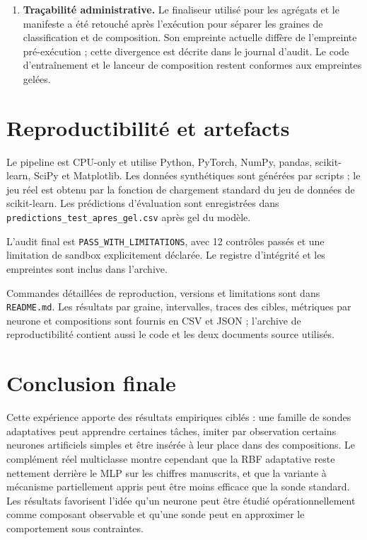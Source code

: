 \documentclass[11pt,a4paper]{article}
\begin{document}
\begin{enumerate}[leftmargin=1.15cm]
\item \textbf{Traçabilité administrative.} Le finaliseur utilisé pour les agrégats et le manifeste a été retouché après l'exécution pour séparer les graines de classification et de composition. Son empreinte actuelle diffère de l'empreinte pré-exécution ; cette divergence est décrite dans le journal d'audit. Le code d'entraînement et le lanceur de composition restent conformes aux empreintes gelées.
\end{enumerate}

\section{Reproductibilité et artefacts}
Le pipeline est CPU-only et utilise Python, PyTorch, NumPy, pandas, scikit-learn, SciPy et Matplotlib. Les données synthétiques sont générées par scripts ; le jeu réel est obtenu par la fonction de chargement standard du jeu de données de scikit-learn. Les prédictions d'évaluation sont enregistrées dans \texttt{predictions\_test\_apres\_gel.csv} après gel du modèle.

L'audit final est \texttt{PASS\_WITH\_LIMITATIONS}, avec 12 contrôles passés et une limitation de sandbox explicitement déclarée. Le registre d'intégrité et les empreintes sont inclus dans l'archive.

Commandes détaillées de reproduction, versions et limitations sont dans \texttt{README.md}. Les résultats par graine, intervalles, traces des cibles, métriques par neurone et compositions sont fournis en CSV et JSON ; l'archive de reproductibilité contient aussi le code et les deux documents source utilisés.

\section{Conclusion finale}
Cette expérience apporte des résultats empiriques ciblés : une famille de sondes adaptatives peut apprendre certaines tâches, imiter par observation certains neurones artificiels simples et être insérée à leur place dans des compositions. Le complément réel multiclasse montre cependant que la RBF adaptative reste nettement derrière le MLP sur les chiffres manuscrits, et que la variante à mécanisme partiellement appris peut être moins efficace que la sonde standard. Les résultats favorisent l'idée qu'un neurone peut être étudié opérationnellement comme composant observable et qu'une sonde peut en approximer le comportement sous contraintes.
\end{document}
